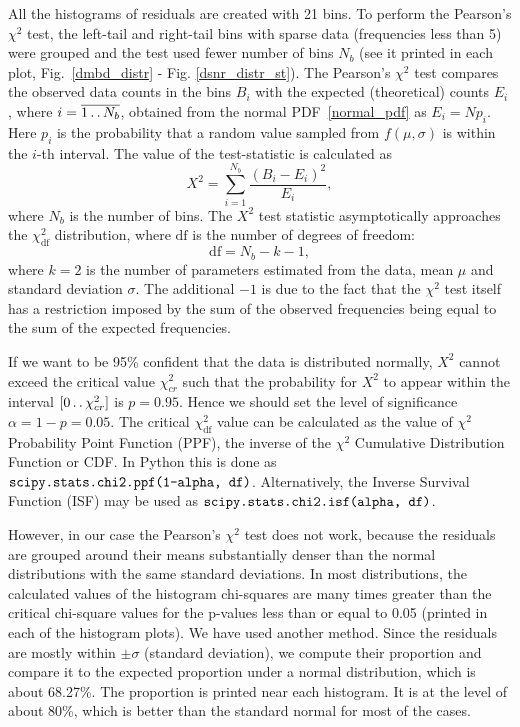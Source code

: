 \documentclass[letterpaper,twoside,12pt]{article}
\newcommand{\twodots}{\mathinner {\ldotp \ldotp}}
\begin{document}
All the histograms of residuals are created with 21 bins. To perform the Pearson's $\chi^2$ test, the left-tail and right-tail bins with sparse data (frequencies less than 5) were grouped and the test used fewer number of bins $N_b$ (see it printed in each plot, Fig.~\ref{dmbd_distr} - Fig. \ref{dsnr_distr_st}). The Pearson's $\chi^2$ test compares the observed data counts in the bins $B_i$ with the expected (theoretical) counts $E_i$, where $i=\overline{1 \twodots N_b}$, obtained from the normal PDF~\eqref{normal_pdf} as $E_i = Np_i$. Here $p_i$ is the probability that a random value sampled from $f(\mu,\sigma)$ is within the $i$-th interval. The value of the test-statistic is calculated as
\begin{equation}
  \label{x2_calc}
  X^2 = \sum_{i=1}^{N_b} \frac{(B_i - E_i)^2}{E_i},
\end{equation}
where $N_b$ is the number of bins.
The $X^2$ test statistic asymptotically approaches the $\chi^2_\mathrm{df}$ distribution, where $\mathrm{df}$ is the number of degrees of freedom:
\begin{equation}
  \label{df}
  \mathrm{df} = N_b - k - 1,
\end{equation}
where $k=2$ is the number of parameters estimated from the data, mean $\mu$ and standard deviation $\sigma$. The additional $-1$ is due to the fact that the $\chi^2$ test itself has a restriction imposed by the sum of the observed frequencies being equal to the sum of the expected frequencies.

If we want to be 95\% confident that the data is distributed normally, $X^2$ cannot exceed the critical value $\chi^2_{cr}$ such that the probability for $X^2$ to appear within the interval $[0 \twodots \chi^2_{cr}]$ is $p=0.95$. Hence we should set the level of significance $\alpha = 1 - p = 0.05$.  The critical $\chi^2_\mathrm{df}$ value can be calculated as the value of $\chi^2$ Probability Point Function (PPF), the inverse of the $\chi^2$ Cumulative Distribution Function or CDF. In Python this is done as $\verb@scipy.stats.chi2.ppf(1-alpha, df)@$. Alternatively, the Inverse Survival Function (ISF) may be used as $\verb@scipy.stats.chi2.isf(alpha, df)@$.

However, in our case the Pearson's $\chi^2$ test does not work, because the residuals are grouped around their means substantially denser than the normal distributions with the same standard deviations. In most distributions, the calculated values of the histogram chi-squares are many times greater than the critical chi-square values for the p-values less than or equal to 0.05 (printed in each of the histogram plots).
We have used another method. Since the residuals are mostly within $\pm \sigma$ (standard deviation), we  compute their proportion and compare it to the expected proportion under a normal distribution, which is about 68.27\%. The proportion is printed near each histogram. It is at the level of about 80\%, which is better than the standard normal for most of the cases.
\end{document}
